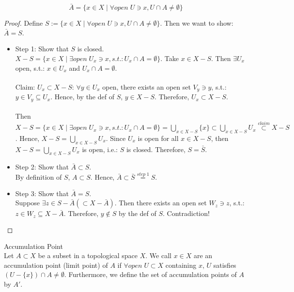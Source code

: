 \begin{proposition}
    $$\bar{A} = \{x \in X\mid \forall open\; U \ni x, U\cap A\neq \emptyset\}$$
\end{proposition}

\begin{proof}
    Define $S:= \{x \in X \mid \forall open\; U\ni x, U\cap A \neq \emptyset\}$. Then we want to show: $\bar{A}=S$.
    \begin{itemize}
        \item Step 1: Show that $S$ is closed.\\
        $X-S=\{x \in X\mid \exists open\; U_x \ni x,s.t.: U_x \cap A=\emptyset\}$. Take $x \in X-S$. Then $\exists U_x$ open, s.t.: $x \in U_x$ and $U_x \cap A=\emptyset$.\\
        \\
        Claim: $U_x \subset X-S$: $\forall y \in U_x$ open, there exists an open set $V_y \ni y$, s.t.: $y \in V_y \subseteq U_x$. Hence, by the def of $S$, $y \in X - S$. Therefore, $U_x \subset X-S$.\\
        \\
        Then $X-S=\{x \in X\mid \exists open\; U_x \ni x,s.t.: U_x \cap A=\emptyset\}= \bigcup_{x \in X-S}\{x\} \subset \bigcup_{x \in X-S}U_x \overset{claim}{\subset} X-S$. Hence, $X-S= \bigcup _{x\in X-S}U_x$. Since $U_x$ is open for all $x\in X-S$, then $X-S=\bigcup_{x\in X-S}U_x$ is open, i.e.: $S$ is closed. Therefore, $S=\bar{S}$.
        \item Step 2: Show that $\bar{A} \subset S$.\\
        By definition of $S$, $A \subset S$. Hence, $\bar{A} \subset \bar{S} \overset{step \;1}{=} S$.
        \item Step 3: Show that $\bar{A}=S$.\\
        Suppose $\exists z \in S-\bar{A} (\subset X-\bar{A})$. Then there exists an open set $W_z \ni z$, s.t.: $z \in W_z \subseteq X - \bar{A}$. Therefore, $y \notin S$ by the def of $S$. Contradiction!
    \end{itemize}
\end{proof}

\begin{definition}{Accumulation Point}\\
Let $A\subset X$ be a subset in a topological space $X$. We call $x \in X$ are an accumulation point (limit point) of $A$ if $\forall open\;U \subset X$ containing $x$, $U$ satisfies $(U-\{x\}) \cap A\neq \emptyset$. Furthermore, we define the set of accumulation points of $A$ by $A'$.
\end{definition}

